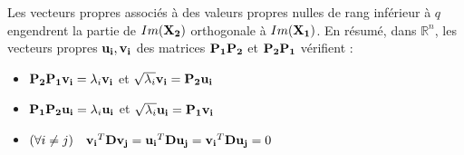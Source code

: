\documentclass[letterpaper,10pt,french]{sphinxmanual}
\begin{document}
\sphinxAtStartPar
Les vecteurs propres associés à des valeurs propres nulles de rang inférieur à \(q\) engendrent la partie de \(Im({\bf {\bf X_2}})\) orthogonale à \(Im({\bf {\bf X_1}})\).
En résumé, dans \(\mathbb{R}^n\), les vecteurs propres \({\bf u_i},{\bf v_i}\) des matrices \({\bf P_1}{\bf P_2}\) et \({\bf P_2}{\bf P_1}\) vérifient :
\begin{itemize}
\item {} 
\sphinxAtStartPar
\({\bf P_2}{\bf P_1}{\bf v_i}=\lambda_i {\bf v_i}\) et \(\sqrt{\lambda_i}{\bf v_i} = {\bf P_2}{\bf u_i}\)

\item {} 
\sphinxAtStartPar
\({\bf P_1}{\bf P_2}{\bf u_i}=\lambda_i {\bf u_i}\) et \(\sqrt{\lambda_i}{\bf u_i} = {\bf P_1}{\bf v_i}\)

\item {} 
\sphinxAtStartPar
\((\forall i\neq j)\quad {\bf v_i}^T{\bf D}{\bf v_j} = {\bf u_i}^T{\bf D}{\bf u_j}={\bf v_i}^T{\bf D}{\bf u_j}=0\)

\end{itemize}
\end{document}
